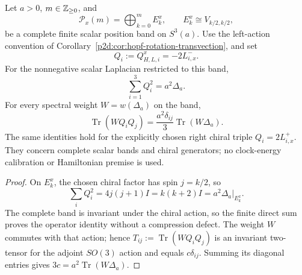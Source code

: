 \documentclass[12pt,a4paper]{article}
\begin{document}
\begin{corollary}
\label{p2d:cor:chiral-scalar-casimir-identity}
Let \(a>0\), \(m\in\mathbb{Z}_{\ge0}\), and
\[
 \mathcal P_x(m)=\bigoplus_{k=0}^{m}E_k^x,\qquad
 E_k^x\cong V_{k/2,k/2},
\]
be a complete finite scalar position band on \(S^3(a)\).
Use the left-action convention of
Corollary~\ref{p2d:cor:hopf-rotation-transvection}, and set
\[
 Q_i:=Q_{H,L,i}^{x}=-2L_{i,x}^-.
\]
For the nonnegative scalar Laplacian restricted to this band,
\[
 \boxed{\sum_{i=1}^{3}Q_i^2=a^2\Delta_a.}
\]
For every spectral weight \(W=w(\Delta_a)\) on the band,
\[
 \operatorname{Tr}(WQ_iQ_j)
 =\frac{a^2\delta_{ij}}{3}\operatorname{Tr}(W\Delta_a).
\]
The same identities hold for the explicitly chosen right chiral triple
\(Q_i=2L_{i,x}^+\).  They concern complete scalar bands and chiral
generators; no clock-energy calibration or Hamiltonian premise is used.
\end{corollary}

\begin{proof}
On \(E_k^x\), the chosen chiral factor has spin \(j=k/2\), so
\[
 \sum_iQ_i^2=4j(j+1)I=k(k+2)I=a^2\Delta_a|_{E_k^x}.
\]
The complete band is invariant under the chiral action, so the finite direct
sum proves the operator identity without a compression defect.
The weight \(W\) commutes with that action; hence
\(T_{ij}:=\operatorname{Tr}(WQ_iQ_j)\) is an invariant two-tensor for
the adjoint \(SO(3)\) action and equals \(c\delta_{ij}\).
Summing its diagonal entries gives
\(3c=a^2\operatorname{Tr}(W\Delta_a)\).
\end{proof}
\end{document}
